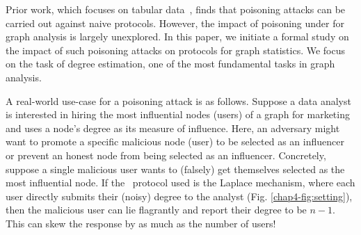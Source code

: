 Prior work, which focuses on tabular data~\cite{Cheu21,Cao_USENIX21,Li22}, finds that  poisoning attacks can be carried out against naive \ldp{} protocols. However, the impact of poisoning under \ldp{} for graph analysis is largely unexplored. In this paper, we initiate a formal study on the impact of such poisoning attacks on \ldp{} protocols for graph statistics. We focus on the task of degree estimation, one of the most fundamental tasks in graph analysis. 

A real-world use-case for a poisoning attack is as follows. Suppose a data analyst is interested in hiring the most influential nodes (users) of a graph for marketing and uses a node's degree as its measure of influence.  Here, an adversary might want to promote a specific malicious node (user) to be selected as an influencer or prevent an honest node from being selected as an influencer. Concretely, suppose a single malicious user wants to (falsely) get themselves selected as the most influential node. If the \ldp~protocol used is the Laplace mechanism, where each user directly submits their (noisy) degree to the analyst (Fig. \ref{chap4-fig:setting}), then the malicious user can lie flagrantly and report their degree to be $n-1$. This can skew the response by as much as the number of users!





